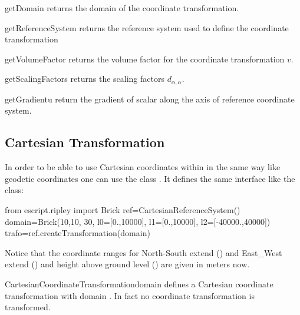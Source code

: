 \begin{methoddesc}[GeodeticCoordinateTransformation]{getDomain}{}
returns the domain of the coordinate transformation.
\end{methoddesc}


\begin{methoddesc}[GeodeticCoordinateTransformation]{getReferenceSystem}{}
returns the reference system used to define the coordinate transformation
\end{methoddesc}


\begin{methoddesc}[GeodeticCoordinateTransformation]{getVolumeFactor}{}
returns the volume factor for the coordinate transformation $v$.
\end{methoddesc}


\begin{methoddesc}[GeodeticCoordinateTransformation]{getScalingFactors}{}
returns the scaling factors $d_{\alpha, \alpha}$.
\end{methoddesc}

\begin{methoddesc}[GeodeticCoordinateTransformation]{getGradient}{u}
return the gradient of scalar  along the axis of
reference coordinate system.
\end{methoddesc}

\subsection{Cartesian Transformation}
In order to be able to use Cartesian coordinates  within \downunder in the same way like geodetic coordinates 
one can use the class .  It defines the same interface 
like the 
 class:
\begin{python}
from escript.ripley import Brick
ref=CartesianReferenceSystem()
domain=Brick(10,10, 30, l0=[0.,10000], l1=[0.,10000], l2=[-40000.,40000])
trafo=ref.createTransformation(domain)
\end{python}
Notice that the coordinate ranges for North-South extend () and 
East_West extend () and height above ground level ()  are given in meters now.

\begin{classdesc}{CartesianCoordinateTransformation}{domain}
defines a Cartesian coordinate transformation with domain . In fact no coordinate transformation is
transformed.  
\end{classdesc}


